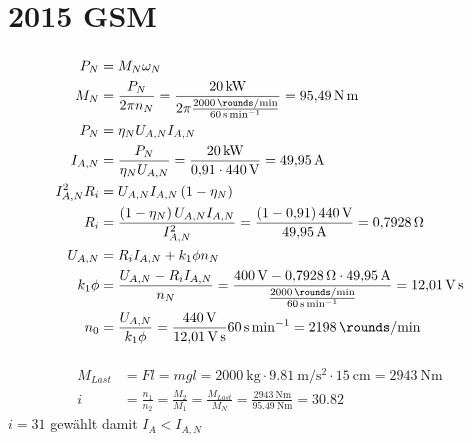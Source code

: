 \documentclass[11pt,a4paper]{scrartcl}
\newcommand{\mybr}[1]{\left(#1\right)}
\newcommand{\0}{_{\mybr{0}}}
\newcommand{\1}{_{\mybr{1}}}
\newcommand{\2}{_{\mybr{2}}}
\begin{document}
\part{2015 GSM}
\section{}
\subsection{}
\begin{align}
P_N&=M_N\omega_N\\
M_N&=\frac{P_N}{2\pi n_N}=\frac{\SI{20}{\kilo\watt}}{2\pi \frac{\SI{2000}{\rounds\per\minute}}{\SI{60}{\second\per\minute}}}=\SI{95.49}{\newton\metre}\\
P_N&=\eta_N U_{A,N} I_{A,N}\\
I_{A,N}&=\frac{P_N}{\eta_N U_{A,N}}=\frac{\SI{20}{\kilo\watt}}{\num{0.91}\cdot\SI{440}{\volt}}=\SI{49.95}{\ampere}\\
I_{A,N}^2 R_i&=U_{A,N} I_{A,N}\mybr{1-\eta_N}\\
R_i&=\frac{\mybr{1-\eta_N}U_{A,N}I_{A,N}}{I_{A,N}^2}=\frac{\mybr{1-\num{0.91}}\SI{440}{\volt}}{\SI{49.95}{\ampere}}=\SI{0.7928}{\ohm}\\
U_{A,N}&=R_i I_{A,N}+k_1\phi n_N\\
k_1\phi&=\frac{U_{A,N}-R_i I_{A,N}}{n_N}=\frac{\SI{400}{\volt}-\SI{0.7928}{\ohm}\cdot\SI{49.95}{\ampere}}{\frac{\SI{2000}{\rounds\per\minute}}{\SI{60}{\second\per\minute}}}=\SI{12.01}{\volt\second}\\
n_0&=\frac{U_{A,N}}{k_1\phi}=\frac{\SI{440}{\volt}}{\SI{12.01}{\volt\second}}\SI{60}{\second\per\minute}=\SI{2198}{\rounds\per\minute}
\end{align}

\subsection{}
\begin{align}
M_{Last}&=F l=m g l=\SI{2000}{\kilogram}\cdot\SI{9.81}{\meter\per\second\squared}\cdot\SI{15}{\centi\metre}=\SI{2943}{\newton\metre}\\
i&=\frac{n_1}{n_2}=\frac{M_2}{M_1}=\frac{M_{Last}}{M_N}=\frac{\SI{2943}{\newton\metre}}{\SI{95.49}{\newton\metre}}=\num{30.82}
\end{align}
$i=31$ gewählt damit $I_A < I_{A,N}$
\end{document}
